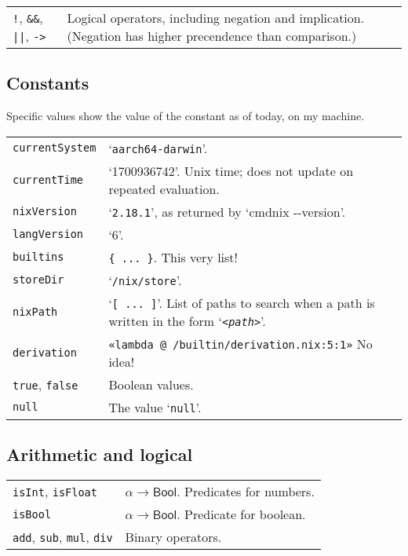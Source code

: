\documentclass[9pt, a4paper, landscape]{extarticle}
\newcommand{\cmd}[1]{\texttt{#1}}
\newcommand{\bln}{\textsf{Bool}}
\begin{document}
\begin{multicols*}{3}
\begin{tabularx}{\columnwidth}{@{}l>{\raggedright\arraybackslash}X@{}}
  \cmd{!}, \cmd{\&\&}, \cmd{||}, \cmd{->} & Logical operators,
  including negation and implication. (Negation has higher precendence
  than comparison.) \\
\end{tabularx}

\columnbreak
\subsection*{Constants}
Specific values show the value of the constant as of today, on my
machine.

\begin{tabularx}{\columnwidth}{@{}l>{\raggedright\arraybackslash}X@{}}
  \cmd{currentSystem} & `\cmd{aarch64-darwin}'. \\
  \cmd{currentTime} & `1700936742'. Unix time; does not update on repeated
  evaluation. \\
  \cmd{nixVersion} & `\cmd{2.18.1}', as returned by `cmd{nix -{}-version}'. \\
  \cmd{langVersion} & `6'. \\
  \cmd{builtins} & \cmd{\{\ ...\ \}}. This very list! \\
  \cmd{storeDir} & `\cmd{/nix/store}'. \\
  \cmd{nixPath} & `\cmd{[\ ...\ ]}'. List of paths to search when a path is
  written in the form `\cmd{<\emph{path}>}'.  \\
  \cmd{derivation} & \cmd{«lambda @ /builtin/derivation.nix:5:1»} No
  idea! \\
  \cmd{true}, \cmd{false} & Boolean values. \\
  \cmd{null} & The value `\cmd{null}'. \\
\end{tabularx}

\subsection*{Arithmetic and logical}

\begin{tabularx}{\columnwidth}{@{}l>{\raggedright\arraybackslash}X@{}}
  \cmd{isInt}, \cmd{isFloat} & $\alpha\to\bln$. Predicates for numbers. \\

  \cmd{isBool} & $\alpha\to\bln$. Predicate for boolean. \\

  \cmd{add}, \cmd{sub}, \cmd{mul}, \cmd{div} & Binary operators. \\


\end{tabularx}
\end{multicols*}
\end{document}
